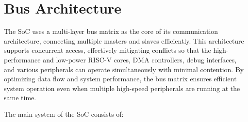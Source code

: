 \documentclass[main\_\_EN.tex]{subfiles}
\begin{document}
\setenglishformatting

\ifglobal
\else
    \clearpage
    \listoftodos
    \listofdonetodos
    \tableofcontents
\fi



\hypertarget{busarch}{}
\chapter{Bus Architecture}
\label{mod:busarch}

The \chipname{} SoC uses a multi-layer bus matrix as the core of its communication architecture, connecting multiple masters and slaves efficiently. This architecture supports concurrent access, effectively mitigating conflicts so that the high-performance and low-power RISC-V cores, DMA controllers, debug interfaces, and various peripherals can operate simultaneously with minimal contention. By optimizing data flow and system performance, the bus matrix ensures efficient system operation even when multiple high-speed peripherals are running at the same time.

The main system of the \chipname{} SoC consists of:
\end{document}
